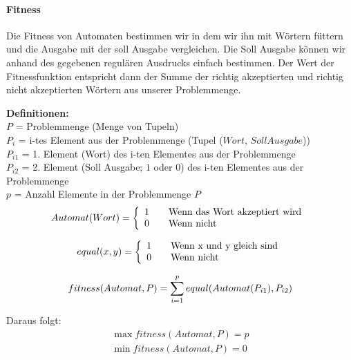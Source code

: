 \paragraph{Fitness}
Die Fitness von Automaten bestimmen wir in dem wir ihn mit Wörtern füttern und die Ausgabe mit der soll Ausgabe vergleichen. Die Soll Ausgabe können wir anhand des gegebenen regulären Ausdrucks einfach bestimmen. Der Wert der Fitnessfunktion entspricht dann der Summe der richtig akzeptierten und richtig nicht akzeptierten Wörtern aus unserer Problemmenge.

\textbf{Definitionen:}\\
$P$ = Problemmenge (Menge von Tupeln)\\
$P_i$ = i-tes Element aus der Problemmenge (Tupel ($Wort$, $Soll Ausgabe$))\\
$P_{i1}$ = 1. Element (Wort) des i-ten Elementes aus der Problemmenge\\
$P_{i2}$ = 2. Element (Soll Ausgabe; $1$ oder $0$) des i-ten Elementes aus der Problemmenge\\
$p$ = Anzahl Elemente in der Problemmenge $P$\\

\begin{equation}
Automat(Wort) = \left\{ 
 \begin{array}{l l}
   1 & \quad \text{Wenn das Wort akzeptiert wird}\\
   0 & \quad \text{Wenn nicht}
 \end{array} \right.\\
\end{equation}

\begin{equation}
equal(x, y) = \left\{ 
 \begin{array}{l l}
   1 & \quad \text{Wenn x und y gleich sind}\\
   0 & \quad \text{Wenn nicht}
 \end{array} \right.
\end{equation}

\begin{equation}
fitness(Automat, P) = \sum_{i=1}^{p} equal(Automat(P_{i1}), P_{i2})\\
\end{equation}

Daraus folgt:\\
\begin{equation}
   \begin{split}
	\max fitness(Automat, P) = p\\
	\min fitness(Automat, P) = 0
   \end{split}
\end{equation}

